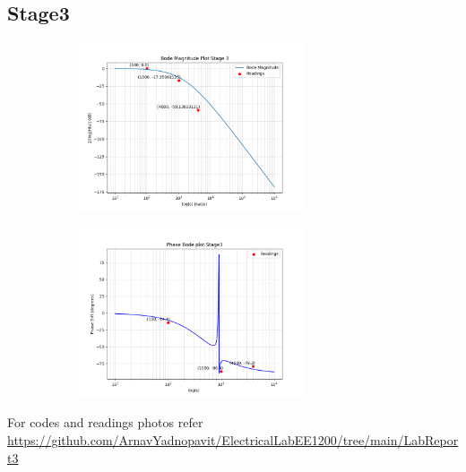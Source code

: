 \documentclass[a4paper,12pt]{article}
\begin{document}
\subsection*{Stage3}
\begin{figure}[H]
    \centering
    \begin{subfigure}{0.5\textwidth}
        \centering
        \includegraphics[height=5cm]{figs/Stage3/Magn.png}
    \end{subfigure}%
    \begin{subfigure}{0.5\textwidth}
        \centering
        \includegraphics[height=5cm]{figs/Stage3/Phase.png}
    \end{subfigure}
\end{figure}
For codes and readings photos refer \\\url{https://github.com/ArnavYadnopavit/ElectricalLabEE1200/tree/main/LabReport3}\\

\end{document}
